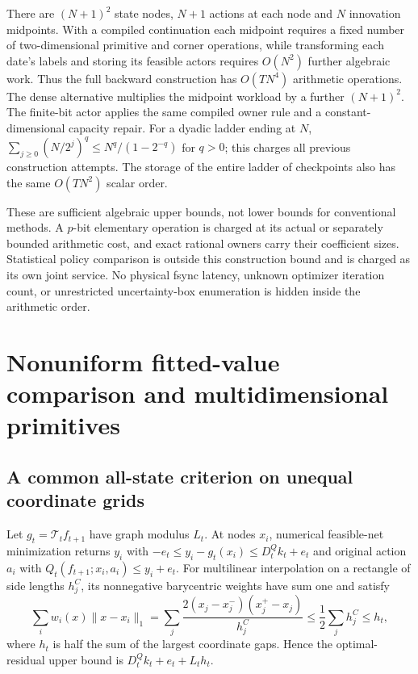 There are $(N+1)^2$ state nodes, $N+1$ actions at each node and $N$ innovation midpoints. With a compiled continuation each midpoint requires a fixed number of two-dimensional primitive and corner operations, while transforming each date's labels and storing its feasible actors requires $O(N^2)$ further algebraic work. Thus the full backward construction has $O(TN^4)$ arithmetic operations. The dense alternative multiplies the midpoint workload by a further $(N+1)^2$. The finite-bit actor applies the same compiled owner rule and a constant-dimensional capacity repair. For a dyadic ladder ending at $N$, $\sum_{j\ge0}(N/2^j)^q\le N^q/(1-2^{-q})$ for $q>0$; this charges all previous construction attempts. The storage of the entire ladder of checkpoints also has the same $O(TN^2)$ scalar order.

These are sufficient algebraic upper bounds, not lower bounds for conventional methods. A $p$-bit elementary operation is charged at its actual or separately bounded arithmetic cost, and exact rational owners carry their coefficient sizes. Statistical policy comparison is outside this construction bound and is charged as its own joint service. No physical fsync latency, unknown optimizer iteration count, or unrestricted uncertainty-box enumeration is hidden inside the arithmetic order.

\section{Nonuniform fitted-value comparison and multidimensional primitives}\label{supp:baselines48}
\subsection{A common all-state criterion on unequal coordinate grids}
Let $g_t=\mathcal T_t f_{t+1}$ have graph modulus $L_t$. At nodes $x_i$, numerical feasible-net minimization returns $y_i$ with
$-e_t\le y_i-g_t(x_i)\le D_t^Qk_t+e_t$ and original action $a_i$ with $Q_t(f_{t+1};x_i,a_i)\le y_i+e_t$.
For multilinear interpolation on a rectangle of side lengths $h_j^C$, its nonnegative barycentric weights have sum one and satisfy
\[
 \sum_i w_i(x)\|x-x_i\|_1
 =\sum_j\frac{2(x_j-x_j^-)(x_j^+-x_j)}{h_j^C}
 \le\frac12\sum_jh_j^C\le h_t,
\]
where $h_t$ is half the sum of the largest coordinate gaps. Hence the optimal-residual upper bound is $D_t^Qk_t+e_t+L_th_t$.


